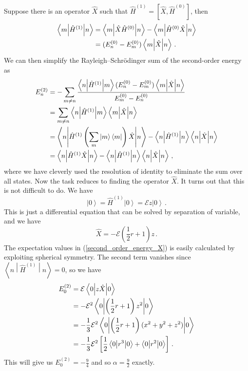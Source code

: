 \documentclass{article}
\theoremstyle{plain}\theoremheaderfont{\normalfont\itshape}\theorembodyfont{\rmfamily}\theoremseparator{.}\newtheorem*{rem}{Remark}\newtheorem*{ex}{Example}\newtheorem*{proof}{Proof}\newtheorem*{altp}{Alternative proof}
\theoremstyle{plain}\theoremheaderfont{\normalfont\bfseries}\theorembodyfont{\rmfamily}\theoremseparator{.}\newtheorem{thm}{Theorem}[section]\newtheorem{lem}[thm]{Lemma}\newtheorem{prop}[thm]{Proposition}\newtheorem*{cor}{Corollary}\newtheorem{defn}[thm]{Definition}\newtheorem{clm}[thm]{Claim}\newtheorem{clminproof}{Claim}
\theoremstyle{break}\theoremheaderfont{\normalfont\itshape}\theorembodyfont{\rmfamily}\theoremseparator{.\medskip}\newtheorem*{proofskip}{Proof}\newtheorem*{exs}{Examples}\newtheorem*{rems}{Remarks}
\theoremstyle{break}\theoremheaderfont{\normalfont\bfseries}\theorembodyfont{\rmfamily}\theoremseparator{.\medskip}\newtheorem{lemskip}[thm]{Lemma}\newtheorem{defnskip}[thm]{Definition}\newtheorem{propskip}[thm]{Proposition}\newtheorem{thmskip}[thm]{Theorem}
\numberwithin{equation}{section}
\newcommand{\bra}[1]{\left\langle #1 \right|}
\newcommand{\ket}[1]{\left| #1 \right\rangle}
\newcommand{\mel}[3]{\left\langle #1 \middle| #2 \middle| #3 \right\rangle}
\newcommand{\expval}[2]{\left\langle #2 \middle| #1 \middle| #2 \right\rangle}
\begin{document}
    Suppose there is an operator \(\hat{X}\) such that \(\hat{H}^{(1)}=[\hat{X},\hat{H}^{(0)}]\), then
    \begin{align}
        \mel{m}{\hat{H}^{(1)}}{n}&=\mel{m}{\hat{X}\hat{H}^{(0)}}{n}-\mel{m}{\hat{H}^{(0)}\hat{X}}{n}\notag \\
        &=(E_n^{(0)}-E_m^{(0)})\mel{m}{\hat{X}}{n}\,.
    \end{align}
    We can then simplify the Rayleigh--Schr\"{o}dinger sum of the second-order energy as
    \begin{align}
        E_n^{(2)}&=-\sum_{m\ne n}\frac{\mel{n}{\hat{H}^{(1)}}{m}(E_n^{(0)}-E_m^{(0)})\mel{m}{\hat{X}}{n}}{E_m^{(0)}-E_n^{(0)}}\notag \\
        &=\sum_{m\ne n}\mel{n}{\hat{H}^{(1)}}{m}\mel{m}{\hat{X}}{n}\notag \\
        &=\mel{n}{\hat{H}^{(1)}\left(\sum_m\ket{m}\bra{m}\right)\hat{X}}{n}-\expval{\hat{H}^{(1)}}{n}\expval{\hat{X}}{n}\notag \\
        &=\expval{\hat{H}^{(1)}\hat{X}}{n}-\expval{\hat{H}^{(1)}}{n}\expval{\hat{X}}{n}\,,\label{second_order_energy_X}
    \end{align}
    where we have cleverly used the resolution of identity to eliminate the sum over all states. Now the task reduces to finding the operator \(\hat{X}\). It turns out that this is not difficult to do. We have
    \begin{equation}
        [\hat{X},\hat{H}^{(0)}]\ket{0}=\hat{H}^{(1)}\ket{0}=\mathcal{E}z\ket{0}\,.
    \end{equation}
    This is just a differential equation that can be solved by separation of variable, and we have
    \begin{equation}
        \hat{X}=-\mathcal{E}\left(\frac{1}{2}r+1\right)z\,.
    \end{equation}
    The expectation values in (\ref{second_order_energy_X}) is easily calculated by exploiting spherical symmetry. The second term vanishes since \(\mel{n}{\hat{H}^{(1)}}{n}=0\), so we have
    \begin{align}
        E_0^{(2)}&=\mathcal{E}\expval{z\hat{X}}{0}\notag \\
        &=-\mathcal{E}^2\expval{\left(\frac{1}{2}r+1\right)z^2}{0}\notag\\
        &=-\frac{1}{3}\mathcal{E}^2\expval{\left(\frac{1}{2}r+1\right)(x^2+y^2+z^2)}{0}\notag\\
        &=-\frac{1}{3}\mathcal{E}^2\left[\frac{1}{2}\expval{r^3}{0}+\expval{r^2}{0}\right]\,.
    \end{align}
    This will give us \(E_0^{(2)}=-\frac{9}{4}\) and so \(\alpha=\frac{9}{2}\) exactly.
\end{document}
